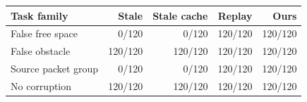 \begin{tabular}{lrrrr}
\toprule
Task family & Stale & Stale cache & Replay & \textbf{Ours} \\
\midrule
False free space & 0/120 & 0/120 & 120/120 & 120/120 \\
False obstacle & 120/120 & 120/120 & 120/120 & 120/120 \\
Source packet group & 0/120 & 0/120 & 120/120 & 120/120 \\
No corruption & 120/120 & 120/120 & 120/120 & 120/120 \\
\bottomrule
\end{tabular}